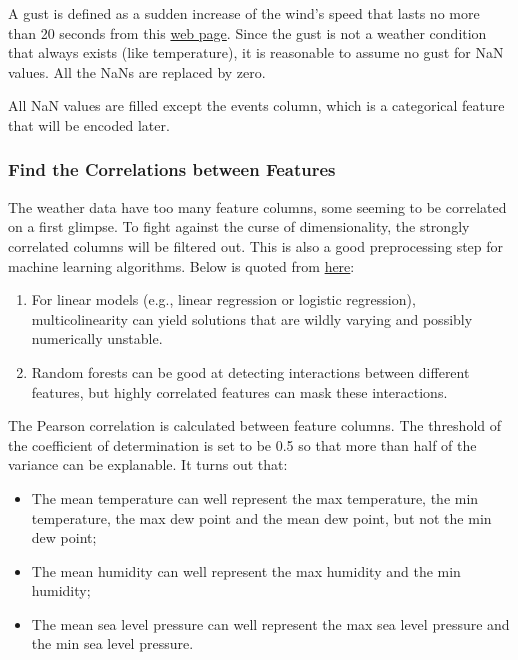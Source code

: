 \documentclass[a4paper]{article}
\begin{document}
			A gust is defined as a sudden increase of the wind’s speed that lasts no more than 20 seconds from this \href{http://www.differencebetween.net/science/nature/difference-between-gust-and-wind/}{web page}. Since the gust is not a weather condition that always exists (like temperature), it is reasonable to assume no gust for NaN values. All the NaNs are replaced by zero.
			
			All NaN values are filled except the events column, which is a categorical feature that will be encoded later.
			
			\subsubsection{Find the Correlations between Features}
			The weather data have too many feature columns, some seeming to be correlated on a first glimpse. To fight against the curse of dimensionality, the strongly correlated columns will be filtered out. This is also a good preprocessing step for machine learning algorithms. Below is quoted from \href{https://datascience.stackexchange.com/questions/24452/in-supervised-learning-why-is-it-bad-to-have-correlated-features}{here}:
			
			\begin{enumerate}
				\item For linear models (e.g., linear regression or logistic regression), multicolinearity can yield solutions that are wildly varying and possibly numerically unstable.
				\item Random forests can be good at detecting interactions between different features, but highly correlated features can mask these interactions.
			\end{enumerate}
			
			The Pearson correlation is calculated between feature columns. The threshold of the coefficient of determination is set to be 0.5 so that more than half of the variance can be explanable. It turns out that:
			
			\begin{itemize}
				\item The mean temperature can well represent the max temperature, the min temperature, the max dew point and the mean dew point, but not the min dew point;
				\item The mean humidity can well represent the max humidity and the min humidity;
				\item The mean sea level pressure can well represent the max sea level pressure and the min sea level pressure.
			\end{itemize}	
			
\end{document}
